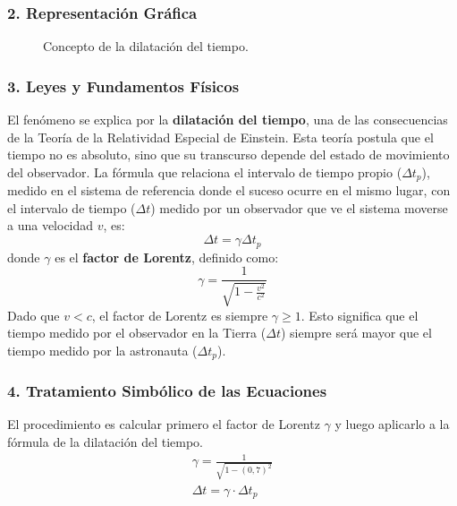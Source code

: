 \subsubsection*{2. Representación Gráfica}
\begin{figure}[H]
    \centering
    \caption{Concepto de la dilatación del tiempo.}
\end{figure}

\subsubsection*{3. Leyes y Fundamentos Físicos}
El fenómeno se explica por la \textbf{dilatación del tiempo}, una de las consecuencias de la Teoría de la Relatividad Especial de Einstein. Esta teoría postula que el tiempo no es absoluto, sino que su transcurso depende del estado de movimiento del observador.
La fórmula que relaciona el intervalo de tiempo propio ($\Delta t_p$), medido en el sistema de referencia donde el suceso ocurre en el mismo lugar, con el intervalo de tiempo ($\Delta t$) medido por un observador que ve el sistema moverse a una velocidad $v$, es:
$$\Delta t = \gamma \Delta t_p$$
donde $\gamma$ es el \textbf{factor de Lorentz}, definido como:
$$\gamma = \frac{1}{\sqrt{1 - \frac{v^2}{c^2}}}$$
Dado que $v<c$, el factor de Lorentz es siempre $\gamma \ge 1$. Esto significa que el tiempo medido por el observador en la Tierra ($\Delta t$) siempre será mayor que el tiempo medido por la astronauta ($\Delta t_p$).

\subsubsection*{4. Tratamiento Simbólico de las Ecuaciones}
El procedimiento es calcular primero el factor de Lorentz $\gamma$ y luego aplicarlo a la fórmula de la dilatación del tiempo.
\begin{gather}
    \gamma = \frac{1}{\sqrt{1 - (0,7)^2}} \\
    \Delta t = \gamma \cdot \Delta t_p
\end{gather}

